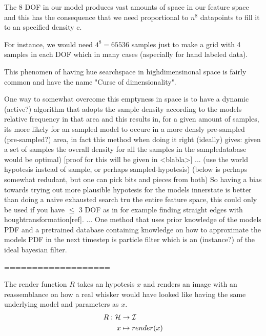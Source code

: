 %
%

%
%

%
%




The 8 DOF in our model produces vast amounts of space in our feature space and this has the consequence that we need proportional to $n^8$ datapoints to fill it to an specified density c.

For instance, we would need $4^8=65536$ samples just to make a grid with 4 samples in each DOF which in many cases (aspecially for hand labeled data). 

This phenomen of having hue searchspace in highdimensinonal space is fairly common and have the name "Curse of dimensionality".

One way to somewhat overcome this emptyness in space is to have a dynamic (active?) algorithm that adopts the sample density 
according to the models relative frequency in that area and this results in, for a given amount of samples, its more likely 
for an sampled model to occure in a more densly pre-sampled (pre-sampled?) area, in fact this method when doing it right (ideally) 
gives: given a set of samples the overall density for all the samples in the sampledatabase would be optimal) [proof for this will be given in <blabla>]
... (use the world hypotesis instead of sample, or perhaps sampled-hypotesis)
(below is perhaps somewhat redudant, but one can pick bits and pieces from both)
So having a bias towards trying out more plausible hypotesis for the models innerstate is better than 
doing a naive exhausted search tru the entire feature space, this could only be used if you have $\le$ 3 DOF as in for example finding straight edges with houghtransformation[ref].
...
One method that uses prior knowledge of the models PDF and a pretrained database containing knowledge on how to approximate the models PDF in the next timestep is particle filter which is an (instance?) of the ideal bayesian filter.



===================

\begin{definition}
    The render function $R$ takes an hypotesis $x$ and renders an image with an
    reassemblance on how a real whisker would have looked like having the same
    underlying model and parameters as $x$.
    \begin{equation}
        \begin{split}
            R : \mathcal{H} &\rightarrow \mathcal{I}\\
                x &\mapsto render(x)
        \end{split}
    \end{equation}
\end{definition}


